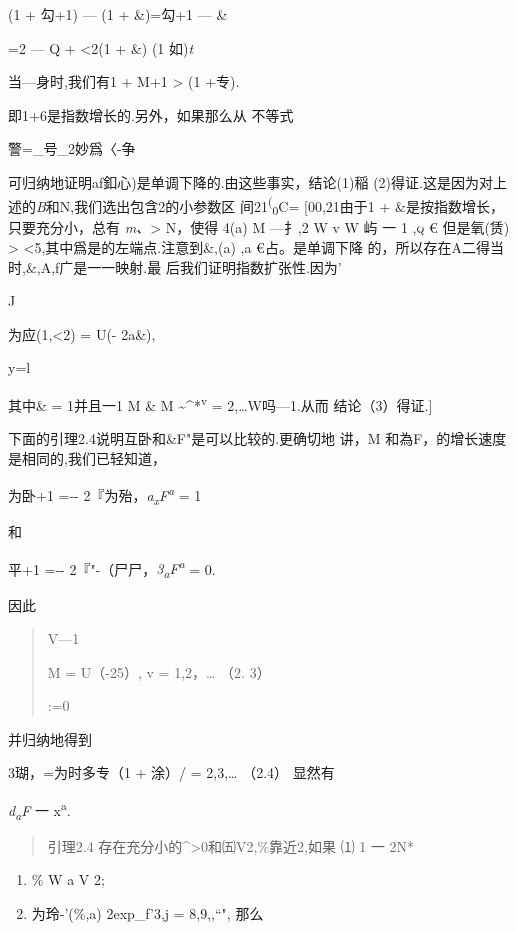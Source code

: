 (1 + 勾+1) --- (1 + \&)=勾+1 --- \&

=2 --- Q + \textless{}2(1 + \&) (1 如)\emph{t}

当---身时,我们有1 + M+1 \textgreater{} \textbar{}(1 +专).

即1+6是指数增长的.另外，如果那么从 不等式

警=\_号\_2妙爲〈-争

可归纳地证明af釦心)是单调下降的.由这些事实，结论(1)稲
(2)得证.这是因为对上述的\emph{B}和N,我们选出包含2的小参数区
间21\textsuperscript{(}\textsubscript{0}C= {[}00,21由于1 +
\&是按指数增长，只要充分小，总有 \emph{m、}\textgreater{} N，使得 4(a) M
---扌,2 W v W 屿 一 1 \textsc{,q €} 但是氧(赁) \textgreater{}
\textless{}5,其中爲是的左端点.注意到\&,(a) ,a €占。是单调下降
的，所以存在A二得当时,\&,A,f广是一一映射.最 后我们证明指数扩张性.因为'

J

\textbar{}为应(1,\textless{}2)\textbar{} = U(- 2a\&),

y=l

其中\& = 1并且一1 M \& M \textasciitilde{}\^{}*\textsuperscript{v} =
2,\ldots{}W吗---1.从而 结论（3）得证.{]}

下面的引理2.4说明互卧和\&F"是可以比较的.更确切地 讲，M
和為F，的增长速度是相同的,我们已轻知道，

为卧+1 =-\/- 2『为殆，\emph{a\textsubscript{x}F\textsuperscript{a}} = 1

和

平+1 =-\/- 2『"-（尸尸，\emph{3\textsubscript{a}F\textsuperscript{a}} =
0.

因此

\begin{quote}
V---1

M = U（-25）, v = 1,2，\ldots{} （2. 3）

:=0
\end{quote}

并归纳地得到

3瑚，=为时多专（1 + 涂）/ = 2,3,\ldots{} （2.4） 显然有

\emph{d\textsubscript{a}F} 一 x\textsuperscript{a}.

\begin{quote}
引理2.4 存在充分小的\^{}\textgreater{}0和㈤V2,\%靠近2,如果 ⑴ 1 一 2N*
\end{quote}

\begin{enumerate}
\def\labelenumi{(\arabic{enumi})}
\setcounter{enumi}{1}
\item
  \% W a V 2;
\item
  \textbar{}为玲-'(\%,a) \textbar{} 2exp\_f'3,j = 8,9,,``", 那么
\end{enumerate}


